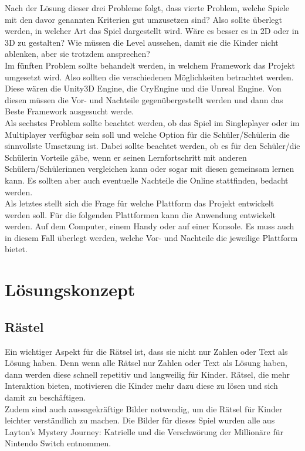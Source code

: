 Nach der Lösung dieser drei Probleme folgt, dass vierte Problem, welche Spiele mit den davor genannten Kriterien gut umzusetzen sind? Also sollte überlegt werden, in welcher Art das Spiel dargestellt wird. Wäre es besser es in 2D oder in 3D zu gestalten? Wie müssen die Level aussehen, damit sie die Kinder nicht ablenken, aber sie trotzdem ansprechen?
\\

Im fünften Problem sollte behandelt werden, in welchem Framework das Projekt umgesetzt wird. Also sollten die verschiedenen Möglichkeiten betrachtet werden. Diese wären die Unity3D Engine, die CryEngine und die Unreal Engine. Von diesen müssen die Vor- und Nachteile gegenübergestellt werden und dann das Beste Framework ausgesucht werde.
\\

Als sechstes Problem sollte beachtet werden, ob das Spiel im Singleplayer oder im Multiplayer verfügbar sein soll und welche Option für die Schüler/Schülerin die sinnvollste Umsetzung ist. Dabei sollte beachtet werden, ob es für den Schüler/die Schülerin Vorteile gäbe, wenn er seinen Lernfortschritt mit anderen Schülern/Schülerinnen vergleichen kann oder sogar mit diesen gemeinsam lernen kann. Es sollten aber auch eventuelle Nachteile die Online stattfinden, bedacht werden.
\\
Als letztes stellt sich die Frage für welche Plattform das Projekt entwickelt werden soll. Für die folgenden Plattformen kann die Anwendung entwickelt werden. Auf dem Computer, einem Handy oder auf einer Konsole. Es muss auch in diesem Fall überlegt werden, welche Vor- und Nachteile die jeweilige Plattform bietet.

\chapter{Lösungskonzept}
\label{cha:loesungskonzept}

\section{Rästel}
Ein wichtiger Aspekt für die Rätsel ist, dass sie nicht nur Zahlen oder Text als Lösung haben. Denn wenn alle Rätsel nur Zahlen oder Text als Lösung haben, dann werden diese schnell repetitiv und langweilig für Kinder. Rätsel, die mehr Interaktion bieten, motivieren die Kinder mehr dazu diese zu lösen und sich damit zu beschäftigen.\\
Zudem sind auch aussagekräftige Bilder notwendig, um die Rätsel für Kinder leichter verständlich zu machen. Die Bilder für dieses Spiel wurden alle aus Layton’s Mystery Journey: Katrielle und die Verschwörung der Millionäre für Nintendo Switch entnommen.\\

